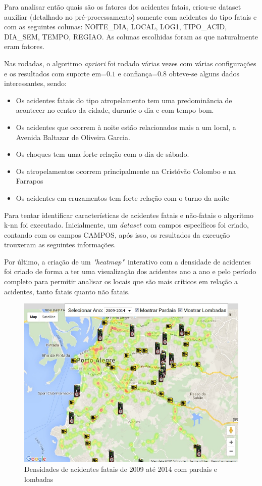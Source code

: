 \documentclass[11pt,article,oneside,a4paper]{abntex2}
\begin{document}
Para analisar então quais são os fatores dos acidentes fatais, criou-se dataset auxiliar (detalhado no pré-processamento) somente com acidentes do tipo fatais e com as seguintes colunas: NOITE\_DIA, LOCAL, LOG1, TIPO\_ACID, DIA\_SEM, TEMPO, REGIAO. As colunas escolhidas foram as que naturalmente eram fatores. 

Nas rodadas, o algoritmo \textit{apriori} foi rodado várias vezes com várias configurações e os resultados com suporte em=$0.1$ e confiança=$0.8$ obteve-se alguns dados interessantes, sendo:

\begin{itemize}
	\item Os acidentes fatais do tipo atropelamento tem uma predominância de acontecer no centro da cidade, durante o dia e com tempo bom. 
	\item Os acidentes que ocorrem à noite estão relacionados mais a um local, a Avenida Baltazar de Oliveira Garcia.
	\item Os choques tem uma forte relação com o dia de sábado.
	\item Os atropelamentos ocorrem principalmente na Cristóvão Colombo e na Farrapos
	\item Os acidentes em cruzamentos tem forte relação com o turno da noite
\end{itemize}

Para tentar identificar características de acidentes fatais e não-fatais o algoritmo k-nn foi executado. Inicialmente, um \textit{dataset} com campos específicos foi criado, contando com os campos CAMPOS, após isso, os resultados da execução trouxeram as seguintes informações.

Por último, a criação de um \textit{"heatmap"}\ interativo com a densidade de acidentes foi criado de forma a ter uma visualização dos acidentes ano a ano e pelo período completo para permitir analisar os locais que são mais críticos em relação a acidentes, tanto fatais quanto não fatais.

\begin{figure}[h!]
	\caption{Densidades de acidentes fatais de 2009 até 2014 com pardais e lombadas} \label{fig:densaci0914}
	\centering
	\includegraphics[width=.8\textwidth]{densidade_acidentes_2009_a_2014.jpg}
\end{figure}
\end{document}
